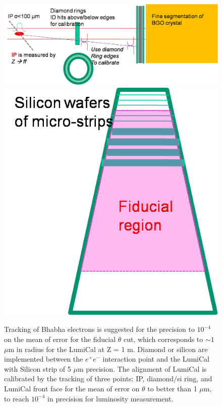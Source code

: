 \begin{figure}[t!] 
	\vspace{.5cm}
	\centering
	\includegraphics[width=.66\linewidth]{Figures/MDI/Bhabha_tracking.png}  
	\hspace{.2cm}
	\includegraphics[width=.24\linewidth]{Figures/MDI/Bhabha_Si_fine_pitch.png} 
	\vspace{.2cm}
	\caption{  Tracking of Bhabha electrons is suggested for the precision
		to $10^{-4}$ on the mean of error for the fiducial $\theta$ cut,
		which corresponds to $\sim 1$ $\mu$m in radius for the LumiCal
		at Z = 1 m.
		Diamond or silicon are implemented between the $e^+ e^-$
		interaction point and the LumiCal with Silicon strip
		of 5 $\mu$m precision. 
		The alignment of LumiCal is calibrated by the 
		tracking of three points: IP, diamond/si ring, and LumiCal front face
		for the mean of error on $\theta$ to better than 1 $\mu$m,
		to reach $10^{-4}$ in precision for luminosity measurement.
		\label{fig:Bhabha_tracking} }
\end{figure}


